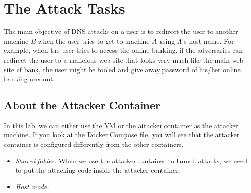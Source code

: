 







\section{The Attack Tasks}


The main objective of DNS attacks on a user is to redirect the user
to another machine $B$ when the user tries to get to machine $A$ using
$A$'s host name. For example, when the user tries to access the online banking,
if the adversaries can redirect the user 
to a malicious web site that looks very much like the main web site 
of bank, the user might be fooled and give away password
of his/her online banking account.



\subsection{About the Attacker Container} 

In this lab, we can either use the VM or the attacker container 
as the attacker machine. If you look at the Docker Compose file, you will
see that the attacker container is configured differently from the other 
containers. 


\begin{itemize}
\item \textit{Shared folder.} When we use the attacker container 
to launch attacks, we need to put the attacking code inside
the attacker container. 



\item \textit{Host mode.} 

\end{itemize}



